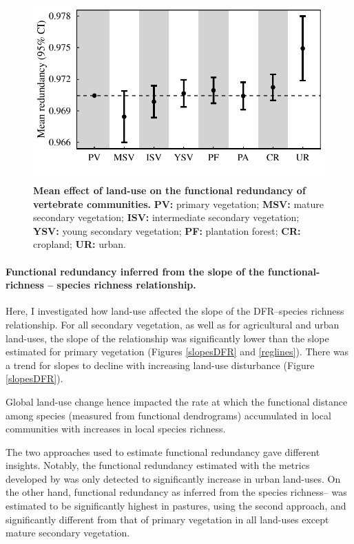 \begin{figure}[h!]
\centering
\includegraphics[scale=0.70]{figures/chapter3/FRedundancy/Mean_effect_LU}
\caption[Mean effect of land-use on the functional redundancy of vertebrate communities]{\textbf{Mean effect of land-use on the functional redundancy of vertebrate communities.} \textbf{PV:} primary vegetation; \textbf{MSV:} mature secondary vegetation; \textbf{ISV:} intermediate secondary vegetation; \textbf{YSV:} young secondary vegetation; \textbf{PF:} plantation forest; \textbf{CR:} cropland; \textbf{UR:} urban.}
\label{LU_mean_FRedundancy}
\end{figure}

\paragraph{Functional redundancy inferred from the slope of the functional-richness -- species richness relationship.} Here, I investigated how land-use affected the slope of the DFR--species richness relationship. For all secondary vegetation, as well as for agricultural and urban land-uses, the slope of the relationship was significantly lower than the slope estimated for primary vegetation (Figures \ref{slopesDFR} and \ref{reglines}). There was a trend for slopes to decline with increasing land-use disturbance (Figure \ref{slopesDFR}). 

Global land-use change hence impacted the rate at which the functional distance among species (measured from  functional dendrograms) accumulated in local communities with increases in local species richness.

The two approaches used to estimate functional redundancy gave different insights. Notably, the functional redundancy estimated with the metrics developed by \citep{Ricotta2016} was only detected to significantly increase in urban land-uses. On the other hand, functional redundancy as inferred from the species richness-- was estimated to be significantly highest in pastures, using the second approach, and significantly different from that of primary vegetation in all land-uses except mature secondary vegetation.

